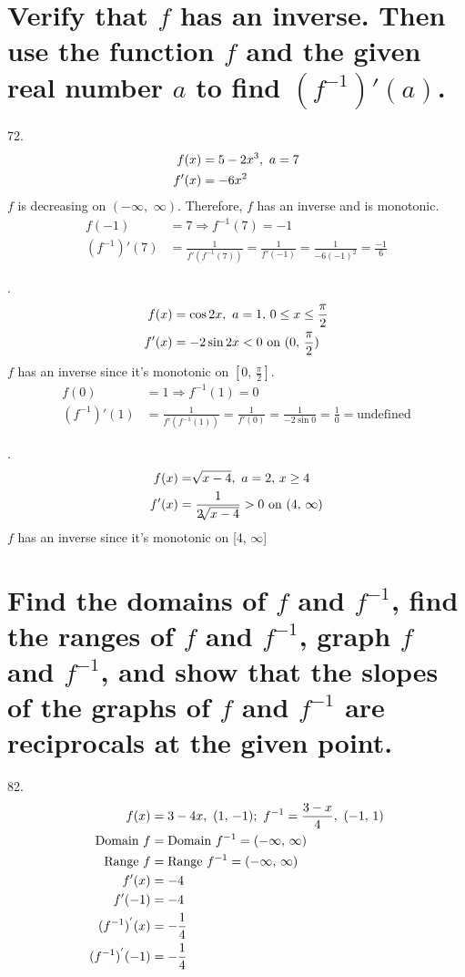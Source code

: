 \documentclass[11pt]{article}
\newcommand*{\vs}{\vspace{1cm}}
\newcommand*{\next}{\noindent}
\newcommand*{\set}{\setcounter{equation}{0}}
\begin{document}
\section{Verify that $f$ has an inverse. Then use the function $f$ and the given real number $a$ to find $(f^{-1})'(a)$.}
72.\begin{align}
    \set
    f(x)&=5-2x^3,\,\, a=7\\
    f'(x)&=-6x^2
\end{align}
$f$ is decreasing on $(-\infty,\,\,\infty)$. Therefore, $f$ has an inverse and is monotonic.\\
\begin{align}
    f(-1)&=7\Rightarrow f^{-1}(7)=-1\\
    (f^{-1})'(7)&=\frac{1}{f'(f^{-1}(7))}=\frac{1}{f'(-1)}=\frac{1}{-6(-1)^2}=\frac{-1}{6}
\end{align}

\vs\next
76.\begin{align}
    \set
    f(x)&=\cos 2x,\,\, a=1,\,0\leq x\leq\frac{\pi}{2}\\
    f'(x)&=-2\sin 2x<0\,\,\text{on}\,\, (0,\,\frac{\pi}{2})
\end{align}
$f$ has an inverse since it's monotonic on $[0,\,\frac{\pi}{2}]$.
\begin{align}
    f(0)&=1\Rightarrow f^{-1}(1)=0\\
    (f^{-1})'(1)&=\frac{1}{f'(f^{-1}(1))}=\frac{1}{f'(0)}=\frac{1}{-2\sin 0}=\frac{1}{0}=\text{undefined}
\end{align}

\vs\next
80.\begin{align}
    \set
    f(x)&=\sqrt[]{x-4},\,\, a=2,\, x\geq 4\\
    f'(x)&=\frac{1}{2\sqrt[]{x-4}}>0\,\,\text{on}\,\, (4,\,\infty)
\end{align}
$f$ has an inverse since it's monotonic on [4, $\infty$]

\section{Find the domains of $f$ and $f^{-1}$, find the ranges of $f$ and $f^{-1}$, graph $f$ and $f^{-1}$, and show that the slopes of the graphs of $f$ and $f^{-1}$ are reciprocals at the given point.}
82.\begin{align}
    \set
    f(x)&=3-4x,\,\, (1,\, -1);\,\, f^{-1}=\frac{3-x}{4},\,\, (-1,\, 1)\\
    \text{Domain}\,\, f&=\text{Domain}\,\, f^{-1}=(-\infty,\,\infty)\\
    \text{Range}\,\, f&=\text{Range}\,\, f^{-1}=(-\infty,\,\infty)\\
    f'(x)&=-4\\
    f'(-1)&=-4\\
    (f^{-1})^{'}(x)&=-\frac{1}{4}\\
    (f^{-1})^{'}(-1)&=-\frac{1}{4}
\end{align}
\end{document}
